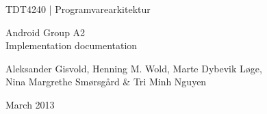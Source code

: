 \begin{titlepage}
\begin{center}
\vspace*{1in}
{\LARGE TDT4240 | Programvarearkitektur}
\par
\vspace{1in}
{\LARGE Android Group A2\\Implementation documentation}
\par
\vspace{1in}
\par
\vfill
\par
\vspace{0.5in}
Aleksander Gisvold, Henning M. Wold, Marte Dybevik Løge,\\
Nina Margrethe Smørsgård \& Tri Minh Nguyen
\par
March 2013
\end{center}
\end{titlepage}
